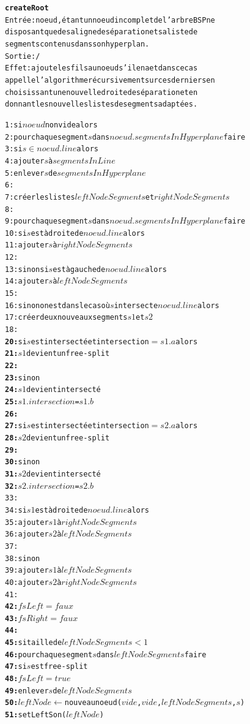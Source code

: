 \documentclass[11pt,a4paper]{article}
\begin{document}
\begin{alltt}
\textbf{createRoot}
Entrée : noeud, étant un noeud incomplet de l'arbre BSP ne
disposant que de sa ligne de séparation et sa liste de
segments contenus dans son hyperplan.
Sortie : /
Effet : ajoute les fils au noeud s'il en a et dans ce cas 
appelle l'algorithme récursivement sur ces derniers en 
choisissant une nouvelle droite de séparation et en 
donnant les nouvelles listes de segments adaptées.

 1: si \(noeud\) non vide alors
 2:   pour chaque segment \(s\) dans \(noeud.segmentsInHyperplane\) faire
 3:     si \(s \in noeud.line\) alors
 4:       ajouter \(s\) à \(segmentsInLine\)
 5:       enlever \(s\) de \(segmentsInHyperplane\)
 6:       
 7:   créer les listes \(leftNodeSegments\) et \(rightNodeSegments\)
 8:   
 9:   pour chaque segment \(s\) dans \(noeud.segmentsInHyperplane\) faire
10:     si \(s\) est à droite de \(noeud.line\) alors
11:       ajouter \(s\) à \(rightNodeSegments\)
12:
13:     sinon si \(s\) est à gauche de \(noeud.line\) alors
14:       ajouter \(s\) à \(leftNodeSegments\)
15:
16:     sinon on est dans le cas où \(s\) intersecte \(noeud.line\) alors
17:       créer deux nouveaux segments \(s1\) et \(s2\)
18:
\textbf{20:}		      si \(s\) est intersecté et intersection \(=s1.a\) alors
\textbf{21:}		        \(s1\) devient un free-split
\textbf{22:}		    
\textbf{23:}		      sinon
\textbf{24:}		        \(s1\) devient intersecté
\textbf{25:}		        \(s1.intersection\) = \(s1.b\)
\textbf{26:}		    
\textbf{27:}		      si \(s\) est intersecté et intersection \(=s2.a\) alors
\textbf{28:}		        \(s2\) devient un free-split
\textbf{29:}		    
\textbf{30:}		      sinon
\textbf{31:}		        \(s2\) devient intersecté
\textbf{32:}		        \(s2.intersection\) = \(s2.b\)
33:		
34:       si \(s1\) est à droite de \(noeud.line\) alors
35:         ajouter \(s1\) à \(rightNodeSegments\)
36:         ajouter \(s2\) à \(leftNodeSegments\)
37:
38:       sinon
39:         ajouter \(s1\) à \(leftNodeSegments\)
40:         ajouter \(s2\) à \(rightNodeSegments\)
41:   
\textbf{42:}	  \(fsLeft = faux\)
\textbf{43:}	  \(fsRight = faux\)
\textbf{44:}      
\textbf{45:}   si taille de \(leftNodeSegments < 1\)
\textbf{46:}     pour chaque segment \(s\) dans \(leftNodeSegments\) faire
\textbf{47:}       si \(s\) est free-split
\textbf{48:}         \(fsLeft = true\)
\textbf{49:}         enlever \(s\) de \(leftNodeSegments\)
\textbf{50:}         \(leftNode \leftarrow \) nouveau noeud (\(vide\), \(vide\), \(leftNodeSegments\), \(s\))
\textbf{51:}         setLeftSon(\(leftNode\))

\end{alltt}
\end{document}
